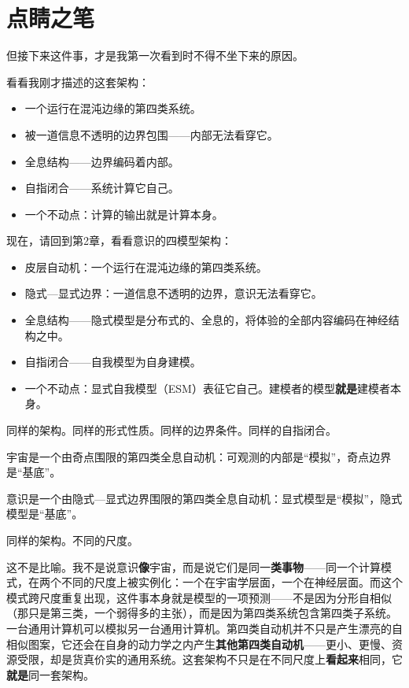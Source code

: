 \documentclass[11pt, twoside, openright]{book}
\begin{document}
\section*{点睛之笔}

但接下来这件事，才是我第一次看到时不得不坐下来的原因。

看看我刚才描述的这套架构：

\begin{itemize}
  \item 一个运行在混沌边缘的第四类系统。
  \item 被一道信息不透明的边界包围------内部无法看穿它。
  \item 全息结构------边界编码着内部。
  \item 自指闭合------系统计算它自己。
  \item 一个不动点：计算的输出就是计算本身。
\end{itemize}

现在，请回到第2章，看看意识的四模型架构：

\begin{itemize}
  \item 皮层自动机：一个运行在混沌边缘的第四类系统。
  \item 隐式---显式边界：一道信息不透明的边界，意识无法看穿它。
  \item 全息结构------隐式模型是分布式的、全息的，将体验的全部内容编码在神经结构之中。
  \item 自指闭合------自我模型为自身建模。
  \item 一个不动点：显式自我模型（ESM）表征它自己。建模者的模型\textbf{就是}建模者本身。
\end{itemize}

同样的架构。同样的形式性质。同样的边界条件。同样的自指闭合。

宇宙是一个由奇点围限的第四类全息自动机：可观测的内部是“模拟”，奇点边界是“基底”。

意识是一个由隐式---显式边界围限的第四类全息自动机：显式模型是“模拟”，隐式模型是“基底”。

同样的架构。不同的尺度。

这不是比喻。我不是说意识\textbf{像}宇宙，而是说它们是同一\textbf{类事物}------同一个计算模式，在两个不同的尺度上被实例化：一个在宇宙学层面，一个在神经层面。而这个模式跨尺度重复出现，这件事本身就是模型的一项预测------不是因为分形自相似（那只是第三类，一个弱得多的主张），而是因为第四类系统包含第四类子系统。一台通用计算机可以模拟另一台通用计算机。第四类自动机并不只是产生漂亮的自相似图案，它还会在自身的动力学之内产生\textbf{其他第四类自动机}------更小、更慢、资源受限，却是货真价实的通用系统。这套架构不只是在不同尺度上\textbf{看起来}相同，它\textbf{就是}同一套架构。
\end{document}
